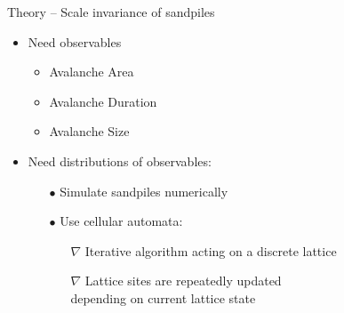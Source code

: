 \documentclass[xcolor=dvipsnames]{beamer}
\newcommand{\myitemsep}{\setlength\itemsep{0.33cm}}
\newcommand{\mysubitemsep}{\setlength\itemsep{0.22cm}}
\begin{document}
    \begin{frame}[t]{Theory -- Scale invariance of sandpiles}
        \begin{itemize}\myitemsep
            \item Need observables
                \begin{itemize}\mysubitemsep
                    \item<2->[$\bullet$] Avalanche Area
                    \item<3->[$\bullet$] Avalanche Duration
                    \item<4->[$\bullet$] Avalanche Size
                \end{itemize}\vspace{1em}
            \item<5> Need distributions of observables:
                \begin{itemize}\mysubitemsep
                    \item[$\bullet$] Simulate sandpiles numerically
                    \item[$\bullet$] Use cellular automata:
                        \begin{itemize}\mysubitemsep
                            \item[$\nabla$] Iterative algorithm acting on a discrete lattice
                            \item[$\nabla$] Lattice sites are repeatedly updated\\
                                            depending on current lattice state
                        \end{itemize}
                \end{itemize}
        \end{itemize}
    \end{frame}
    
\end{document}
